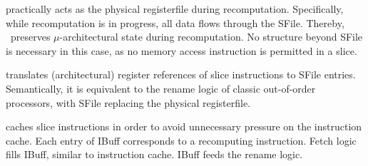   practically acts as the physical registerfile during recomputation. 
Specifically, while recomputation is in progress, all data flows through the SFile. Thereby, \arch\ preserves $\mu$-architectural state during recomputation. No structure beyond SFile is necessary in this case, as no memory access instruction is permitted in a slice.

 translates (architectural) register references of slice instructions to SFile entries.
Semantically, it is equivalent to the rename logic of classic out-of-order processors, with SFile replacing the physical registerfile. 

caches slice instructions in order to avoid
unnecessary pressure on the instruction cache.
Each entry of IBuff corresponds to a recomputing instruction. Fetch logic fills IBuff, similar to instruction cache. IBuff feeds the rename logic. 


